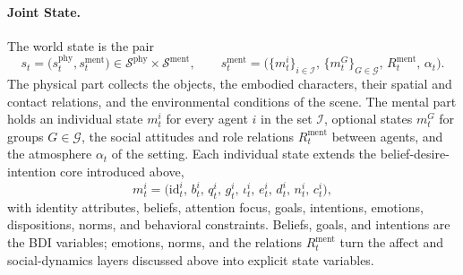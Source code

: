 \paragraph{Joint State.}
The world state is the pair
\begin{equation}
\label{eq:p3_s8_6_mwm_state}
s_t = \big(s_t^{\mathrm{phy}}, s_t^{\mathrm{ment}}\big) \in \mathcal{S}^{\mathrm{phy}} \times \mathcal{S}^{\mathrm{ment}},
\qquad
s_t^{\mathrm{ment}} = \big(\{m_t^{i}\}_{i\in\mathcal{I}},\, \{m_t^{G}\}_{G\in\mathcal{G}},\, R_t^{\mathrm{ment}},\, \alpha_t\big).
\end{equation}
The physical part collects the objects, the embodied characters, their spatial and contact relations, and the environmental conditions of the scene. The mental part holds an individual state $m_t^{i}$ for every agent $i$ in the set $\mathcal{I}$, optional states $m_t^{G}$ for groups $G\in\mathcal{G}$, the social attitudes and role relations $R_t^{\mathrm{ment}}$ between agents, and the atmosphere $\alpha_t$ of the setting. Each individual state extends the belief-desire-intention core introduced above,
\begin{equation}
\label{eq:p3_s8_6_mwm_individual}
m_t^{i} = \big(\mathrm{id}_t^{i},\, b_t^{i},\, q_t^{i},\, g_t^{i},\, \iota_t^{i},\, e_t^{i},\, d_t^{i},\, n_t^{i},\, c_t^{i}\big),
\end{equation}
with identity attributes, beliefs, attention focus, goals, intentions, emotions, dispositions, norms, and behavioral constraints. 
Beliefs, goals, and intentions are the BDI variables; emotions, norms, and the relations $R_t^{\mathrm{ment}}$ turn the affect and social-dynamics layers discussed above into explicit state variables.

